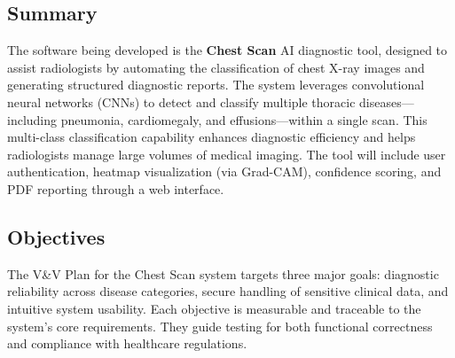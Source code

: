 \documentclass[12pt, titlepage]{article}
\begin{document}

\subsection{Summary}
The software being developed is the \textbf{Chest Scan} AI diagnostic tool, designed to assist radiologists by automating the classification of chest X-ray images and generating structured diagnostic reports. The system leverages convolutional neural networks (CNNs) to detect and classify multiple thoracic diseases---including pneumonia, cardiomegaly, and effusions---within a single scan. This multi-class classification capability enhances diagnostic efficiency and helps radiologists manage large volumes of medical imaging. The tool will include user authentication, heatmap visualization (via Grad-CAM), confidence scoring, and PDF reporting through a web interface.

\subsection{Objectives}
The V\&V Plan for the Chest Scan system targets three major goals: diagnostic reliability across disease categories, secure handling of sensitive clinical data, and intuitive system usability. Each objective is measurable and traceable to the system's core requirements. They guide testing for both functional correctness and compliance with healthcare regulations.
\end{document}

